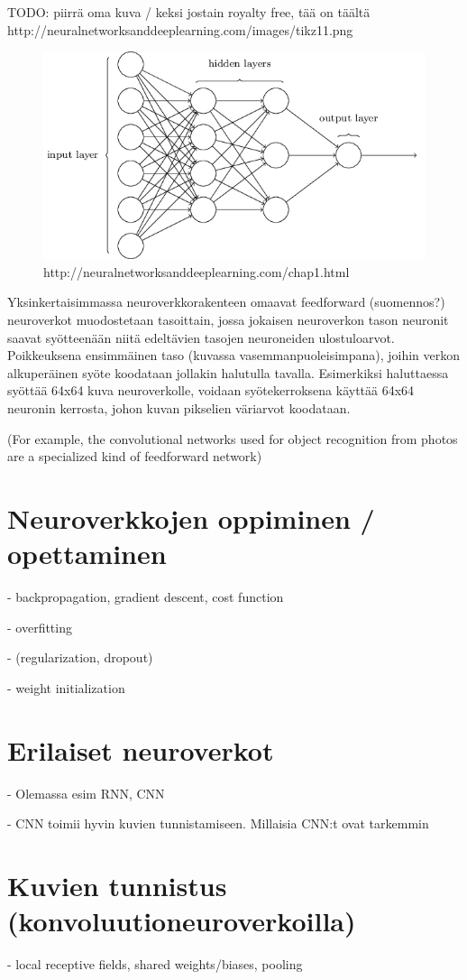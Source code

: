\documentclass[11pt]{article}
\theoremstyle{plain}
\theoremstyle{definition}
\begin{document}
   TODO: piirrä oma kuva / keksi jostain royalty free, tää on täältä http://neuralnetworksanddeeplearning.com/images/tikz11.png
   \begin{figure}[h]
   \centering
   \includegraphics[scale=0.5]{basic-neuralnet}
   \caption{http://neuralnetworksanddeeplearning.com/chap1.html}
   \end{figure}

   Yksinkertaisimmassa neuroverkkorakenteen omaavat feedforward (suomennos?) neuroverkot muodostetaan tasoittain, jossa jokaisen neuroverkon tason neuronit saavat syötteenään niitä edeltävien tasojen neuroneiden ulostuloarvot. Poikkeuksena ensimmäinen taso (kuvassa vasemmanpuoleisimpana), joihin verkon alkuperäinen syöte koodataan jollakin halutulla tavalla. Esimerkiksi haluttaessa syöttää 64x64 kuva neuroverkolle, voidaan syötekerroksena käyttää 64x64 neuronin kerrosta, johon kuvan pikselien väriarvot koodataan.

   (For example, the convolutional networks used for object recognition from photos are a specialized kind of feedforward network)

   \section{Neuroverkkojen oppiminen / opettaminen}
   - backpropagation, gradient descent, cost function

   - overfitting

   - (regularization, dropout)

   - weight initialization

   \section{Erilaiset neuroverkot}
   - Olemassa esim RNN, CNN

   - CNN toimii hyvin kuvien tunnistamiseen. Millaisia CNN:t ovat tarkemmin
   \section{Kuvien tunnistus (konvoluutioneuroverkoilla)}
   - local receptive fields, shared weights/biases, pooling

   \renewcommand{\refname}{Lähteet}
   
   

  
\end{document}
